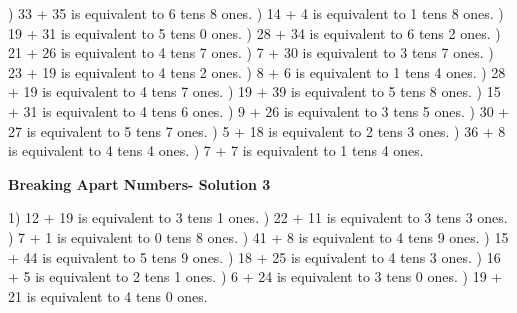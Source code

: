 \documentclass{article}%
\begin{document}
) 33 + 35 is equivalent to 6 tens 8 ones.%
) 14 + 4 is equivalent to 1 tens 8 ones.%
) 19 + 31 is equivalent to 5 tens 0 ones.%
) 28 + 34 is equivalent to 6 tens 2 ones.%
) 21 + 26 is equivalent to 4 tens 7 ones.%
) 7 + 30 is equivalent to 3 tens 7 ones.%
) 23 + 19 is equivalent to 4 tens 2 ones.%
) 8 + 6 is equivalent to 1 tens 4 ones.%
) 28 + 19 is equivalent to 4 tens 7 ones.%
) 19 + 39 is equivalent to 5 tens 8 ones.%
) 15 + 31 is equivalent to 4 tens 6 ones.%
) 9 + 26 is equivalent to 3 tens 5 ones.%
) 30 + 27 is equivalent to 5 tens 7 ones.%
) 5 + 18 is equivalent to 2 tens 3 ones.%
) 36 + 8 is equivalent to 4 tens 4 ones.%
) 7 + 7 is equivalent to 1 tens 4 ones.%
\newline%
\newpage%
\large%
\begin{center}%
\textbf{Breaking Apart Numbers- Solution 3}%
\newline%
\end{center} \normalsize%
1) 12 + 19 is equivalent to 3 tens 1 ones.%
) 22 + 11 is equivalent to 3 tens 3 ones.%
) 7 + 1 is equivalent to 0 tens 8 ones.%
) 41 + 8 is equivalent to 4 tens 9 ones.%
) 15 + 44 is equivalent to 5 tens 9 ones.%
) 18 + 25 is equivalent to 4 tens 3 ones.%
) 16 + 5 is equivalent to 2 tens 1 ones.%
) 6 + 24 is equivalent to 3 tens 0 ones.%
) 19 + 21 is equivalent to 4 tens 0 ones.%
\newline%
\end{document}

